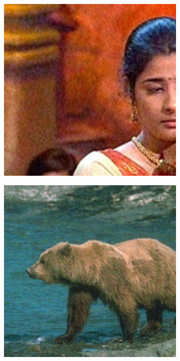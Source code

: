 \begin{figure}
\begin{subfigure}[t]{0.19\textwidth}
    \end{subfigure}
    \hfill
    \begin{subfigure}[t]{0.19\textwidth}
        \centering
        \includegraphics[width=1\textwidth]{images/guided/resize_singer.png}
    \end{subfigure}
    \hfill
    \begin{subfigure}[t]{0.19\textwidth}
        \centering
        \includegraphics[width=1\textwidth]{images/guided/resize_bears.png}

\end{subfigure}
\end{figure}
